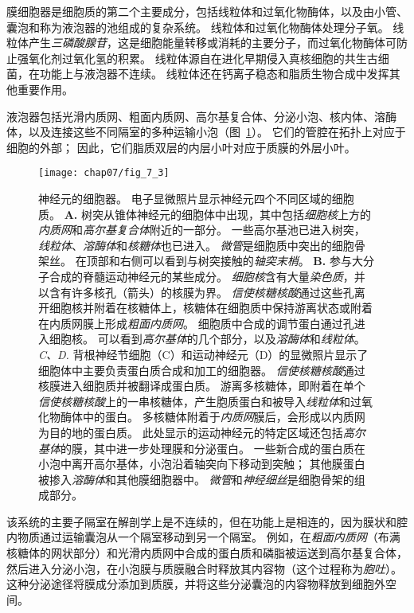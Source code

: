 膜细胞器是细胞质的第二个主要成分，包括线粒体和过氧化物酶体，以及由小管、囊泡和称为液泡器的池组成的复杂系统。
线粒体和过氧化物酶体处理分子氧。
线粒体产生\textit{三磷酸腺苷}，这是细胞能量转移或消耗的主要分子，而过氧化物酶体可防止强氧化剂过氧化氢的积累。
线粒体源自在进化早期侵入真核细胞的共生古细菌，在功能上与液泡器不连续。
线粒体还在钙离子稳态和脂质生物合成中发挥其他重要作用。


液泡器包括光滑内质网、粗面内质网、高尔基复合体、分泌小泡、核内体、溶酶体，以及连接这些不同隔室的多种运输小泡（图~\ref{fig:7_3}）。
它们的管腔在拓扑上对应于细胞的外部；
因此，它们脂质双层的内层小叶对应于质膜的外层小叶。


\begin{figure}[htbp]
	\centering
	\texttt{[image: chap07/fig\_7\_3]}
	\caption{神经元的细胞器。
		电子显微照片显示神经元四个不同区域的细胞质\cite{peters1991neuropil}。
		\textbf{A.} 树突从锥体神经元的细胞体中出现，其中包括\textit{细胞核}上方的\textit{内质网}和\textit{高尔基复合体}附近的一部分。
		一些高尔基池已进入树突，\textit{线粒体}、\textit{溶酶体}和\textit{核糖体}也已进入。
		\textit{微管}是细胞质中突出的细胞骨架丝。
		在顶部和右侧可以看到与树突接触的\textit{轴突末梢}。
		\textbf{B.} 参与大分子合成的脊髓运动神经元的某些成分。
		\textit{细胞核}含有大量\textit{染色质}，并以含有许多核孔（箭头）的核膜为界。
		\textit{信使核糖核酸}通过这些孔离开细胞核并附着在核糖体上，核糖体在细胞质中保持游离状态或附着在内质网膜上形成\textit{粗面内质网}。
		细胞质中合成的调节蛋白通过孔进入细胞核。
		可以看到\textit{高尔基体}的几个部分，以及\textit{溶酶体}和\textit{线粒体}。
		\textit{C、D.} 背根神经节细胞（C）和运动神经元（D）的显微照片显示了细胞体中主要负责蛋白质合成和加工的细胞器。
		\textit{信使核糖核酸}通过核膜进入细胞质并被翻译成蛋白质。
		游离多核糖体，即附着在单个\textit{信使核糖核酸}上的一串核糖体，产生胞质蛋白和被导入\textit{线粒体}和过氧化物酶体中的蛋白。
		多核糖体附着于\textit{内质网}膜后，会形成以内质网为目的地的蛋白质。
		此处显示的运动神经元的特定区域还包括\textit{高尔基体}的膜，其中进一步处理膜和分泌蛋白。
		一些新合成的蛋白质在小泡中离开高尔基体，小泡沿着轴突向下移动到突触；
		其他膜蛋白被掺入\textit{溶酶体}和其他膜细胞器中。
		\textit{微管}和\textit{神经细丝}是细胞骨架的组成部分。}
	\label{fig:7_3}
\end{figure}


该系统的主要子隔室在解剖学上是不连续的，但在功能上是相连的，因为膜状和腔内物质通过运输囊泡从一个隔室移动到另一个隔室。
例如，在\textit{粗面内质网}（布满核糖体的网状部分）和光滑内质网中合成的蛋白质和磷脂被运送到高尔基复合体，然后进入分泌小泡，在小泡膜与质膜融合时释放其内容物（这个过程称为\textit{胞吐}）。
这种分泌途径将膜成分添加到质膜，并将这些分泌囊泡的内容物释放到细胞外空间。


